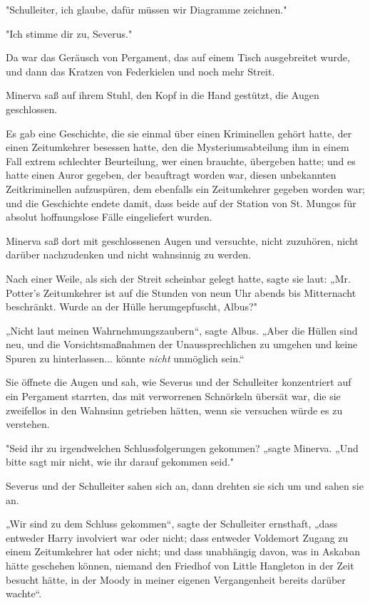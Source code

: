 {"Schulleiter, ich glaube, dafür müssen wir Diagramme zeichnen."

"Ich stimme dir zu, Severus."

Da war das Geräusch von Pergament, das auf einem Tisch ausgebreitet wurde, und dann das Kratzen von Federkielen und noch mehr Streit.

Minerva saß auf ihrem Stuhl, den Kopf in die Hand gestützt, die Augen geschlossen.

Es gab eine Geschichte, die sie einmal über einen Kriminellen gehört hatte, der einen Zeitumkehrer besessen hatte, den die Mysteriumsabteilung ihm in einem Fall extrem schlechter Beurteilung, wer einen brauchte, übergeben hatte; und es hatte einen Auror gegeben, der beauftragt worden war, diesen unbekannten Zeitkriminellen aufzuspüren, dem ebenfalls ein Zeitumkehrer gegeben worden war; und die Geschichte endete damit, dass beide auf der Station von St. Mungos für absolut hoffnungslose Fälle eingeliefert wurden.

Minerva saß dort mit geschlossenen Augen und versuchte, nicht zuzuhören, nicht darüber nachzudenken und nicht wahnsinnig zu werden.

Nach einer Weile, als sich der Streit scheinbar gelegt hatte, sagte sie laut: „Mr. Potter's Zeitumkehrer ist auf die Stunden von neun Uhr abends bis Mitternacht beschränkt. Wurde an der Hülle herumgepfuscht, Albus?"

„Nicht laut meinen Wahrnehmungszaubern“, sagte Albus. „Aber die Hüllen sind neu, und die Vorsichtsmaßnahmen der Unaussprechlichen zu umgehen und keine Spuren zu hinterlassen... könnte \emph{nicht} unmöglich sein.“

Sie öffnete die Augen und sah, wie Severus und der Schulleiter konzentriert auf ein Pergament starrten, das mit verworrenen Schnörkeln übersät war, die sie zweifellos in den Wahnsinn getrieben hätten, wenn sie versuchen würde es zu verstehen.

"Seid ihr zu irgendwelchen Schlussfolgerungen gekommen? „sagte Minerva. „Und bitte sagt mir nicht, wie ihr darauf gekommen seid."

Severus und der Schulleiter sahen sich an, dann drehten sie sich um und sahen sie an.

„Wir sind zu dem Schluss gekommen“, sagte der Schulleiter ernsthaft, „dass entweder Harry involviert war oder nicht; dass entweder Voldemort Zugang zu einem Zeitumkehrer hat oder nicht; und dass unabhängig davon, was in Askaban hätte geschehen können, niemand den Friedhof von Little Hangleton in der Zeit besucht hätte, in der Moody in meiner eigenen Vergangenheit bereits darüber wachte“.

}
